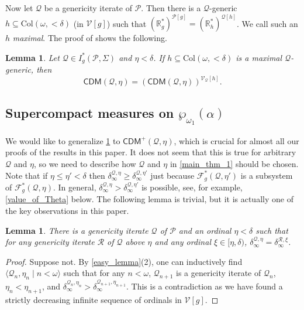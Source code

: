 \documentclass{amsart}
\newtheorem{lem}[dfn]{Lemma}
\renewcommand{\subset}{\subseteq}
\newcommand{\power}{\wp}
\begin{document}
Now let $\mathcal{Q}$ be a genericity iterate of $\mathcal{P}$.
Then there is a $\mathcal{Q}$-generic $h\subset\mathrm{Col}(\omega, {<}\delta)$ (in $\mathcal{V}[g]$) such that $(\mathbb{R}^*_g)^{\mathcal{P}[g]}=(\mathbb{R}^*_h)^{\mathcal{Q}[h]}$.
We call such an $h$ \emph{maximal}.
The proof of \cite[Proposition 4.2]{CoveringChang} shows the following.

\begin{lem}\label{locality_of_CDM}
Let $\mathcal{Q}\in I^*_g(\mathcal{P}, \Sigma)$ and $\eta<\delta$.
If $h\subset\mathrm{Col}(\omega, {<}\delta)$ is a maximal $\mathcal{Q}$-generic, then
\[
\mathsf{CDM}(\mathcal{Q}, \eta)=(\mathsf{CDM}(\mathcal{Q}, \eta))^{\mathcal{V}_{\mathcal{Q}}[h]}.
\]
\end{lem}

\subsection{Supercompact measures on $\power_{\omega_1}(\alpha)$}

We would like to generalize \cref{locality_of_CDM} to $\mathsf{CDM}^+(\mathcal{Q}, \eta)$, which is crucial for almost all our proofs of the results in this paper.
It does not seem that this is true for arbitrary $\mathcal{Q}$ and $\eta$, so we need to describe how $\mathcal{Q}$ and $\eta$ in \cref{main_thm_1} should be chosen.
Note that if $\eta\leq\eta'<\delta$ then $\delta^{\mathcal{Q}, \eta}_{\infty}\geq\delta^{\mathcal{Q}, \eta'}_{\infty}$ just because $\mathcal{F}^*_g(\mathcal{Q}, \eta')$ is a subsystem of $\mathcal{F}^*_g(\mathcal{Q}, \eta)$.
In general, $\delta^{\mathcal{Q}, \eta}_{\infty}>\delta^{\mathcal{Q}, \eta'}_{\infty}$ is possible, see, for example, \cref{value_of_Theta} below.
The following lemma is trivial, but it is actually one of the key observations in this paper.

\begin{lem}\label{stabilizing_delta_infty}
    There is a genericity iterate $\mathcal{Q}$ of $\mathcal{P}$ and an ordinal $\eta<\delta$ such that for any genericity iterate $\mathcal{R}$ of $\mathcal{Q}$ above $\eta$ and any ordinal $\xi\in [\eta, \delta)$, $\delta^{\mathcal{Q}, \eta}_{\infty}=\delta^{\mathcal{R}, \xi}_{\infty}$.
\end{lem}
\begin{proof}
    Suppose not.
    By \cref{easy_lemma}(2), one can inductively find $\langle\mathcal{Q}_n, \eta_n\mid n<\omega\rangle$ such that for any $n<\omega$, $\mathcal{Q}_{n+1}$ is a genericity iterate of $\mathcal{Q}_n$, $\eta_n<\eta_{n+1}$, and $\delta^{\mathcal{Q}_n, \eta_n}_{\infty}>\delta^{\mathcal{Q}_{n+1}, \eta_{n+1}}_{\infty}$.
    This is a contradiction as we have found a strictly decreasing infinite sequence of ordinals in $\mathcal{V}[g]$.
\end{proof}
\end{document}
